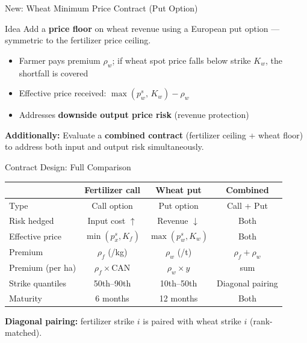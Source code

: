 \documentclass[aspectratio=169,12pt]{beamer}
\newcommand{\eur}{\texteuro}
\begin{document}
\begin{frame}{New: Wheat Minimum Price Contract (Put Option)}
\begin{block}{Idea}
Add a \textbf{price floor} on wheat revenue using a European put option --- symmetric to the fertilizer price ceiling.
\end{block}

\vspace{0.5em}
\begin{itemize}
    \item Farmer pays premium $\rho_w$; if wheat spot price falls below strike $K_w$, the shortfall is covered
    \item Effective price received: $\max(p_w^s,\, K_w) - \rho_w$
    \item Addresses \textbf{downside output price risk} (revenue protection)
\end{itemize}

\vspace{0.5em}
\textbf{Additionally:} Evaluate a \textbf{combined contract} (fertilizer ceiling + wheat floor) to address both input and output risk simultaneously.
\end{frame}

\begin{frame}{Contract Design: Full Comparison}
\begin{table}
\centering
\small
\begin{tabular}{lccc}
\toprule
 & \textbf{Fertilizer call} & \textbf{Wheat put} & \textbf{Combined} \\
\midrule
Type & Call option & Put option & Call + Put \\
Risk hedged & Input cost $\uparrow$ & Revenue $\downarrow$ & Both \\
Effective price & $\min(p_x^s, K_f)$ & $\max(p_w^s, K_w)$ & Both \\
Premium & $\rho_f$ (\eur/kg) & $\rho_w$ (\eur/t) & $\rho_f + \rho_w$ \\
Premium (per ha) & $\rho_f \times \text{CAN}$ & $\rho_w \times y$ & sum \\
\midrule
Strike quantiles & 50th--90th & 10th--50th & Diagonal pairing \\
Maturity & 6 months & 12 months & Both \\
\bottomrule
\end{tabular}
\end{table}

\vspace{0.3em}
\small \textbf{Diagonal pairing:} fertilizer strike $i$ is paired with wheat strike $i$ (rank-matched).
\end{frame}
\end{document}
